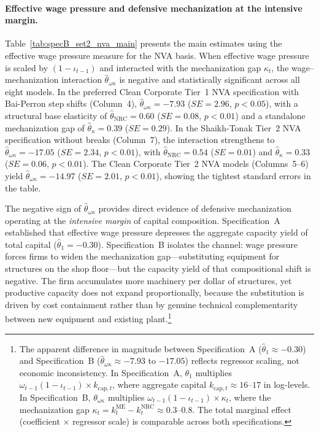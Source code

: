 \paragraph{Effective wage pressure and defensive mechanization at the intensive margin.}
Table~\ref{tab:specB_set2_nva_main} presents the main estimates using the effective wage pressure measure for the NVA basis. When effective wage pressure is scaled by $(1-\iota_{t-1})$ and interacted with the mechanization gap $\kappa_t$, the wage--mechanization interaction $\hat{\theta}_{\omega\kappa}$ is negative and statistically significant across all eight models. In the preferred Clean Corporate Tier~1 NVA specification with Bai-Perron step shifts (Column~4), $\hat{\theta}_{\omega\kappa} = -7.93$ ($SE = 2.96$, $p < 0.05$), with a structural base elasticity of $\hat{\theta}_{\text{NRC}} = 0.60$ ($SE = 0.08$, $p < 0.01$) and a standalone mechanization gap of $\hat{\theta}_\kappa = 0.39$ ($SE = 0.29$). In the Shaikh-Tonak Tier~2 NVA specification without breaks (Column~7), the interaction strengthens to $\hat{\theta}_{\omega\kappa} = -17.05$ ($SE = 2.34$, $p < 0.01$), with $\hat{\theta}_{\text{NRC}} = 0.54$ ($SE = 0.01$) and $\hat{\theta}_\kappa = 0.33$ ($SE = 0.06$, $p < 0.01$). The Clean Corporate Tier~2 NVA models (Columns~5--6) yield $\hat{\theta}_{\omega\kappa} = -14.97$ ($SE = 2.01$, $p < 0.01$), showing the tightest standard errors in the table.

The negative sign of $\hat{\theta}_{\omega\kappa}$ provides direct evidence of defensive mechanization operating at the \emph{intensive margin} of capital composition. Specification~A established that effective wage pressure depresses the aggregate capacity yield of total capital ($\hat{\theta}_1 = -0.30$). Specification~B isolates the channel: wage pressure forces firms to widen the mechanization gap---substituting equipment for structures on the shop floor---but the capacity yield of that compositional shift is negative. The firm accumulates more machinery per dollar of structures, yet productive capacity does not expand proportionally, because the substitution is driven by cost containment rather than by genuine technical complementarity between new equipment and existing plant.\footnote{The apparent difference in magnitude between Specification~A ($\hat{\theta}_1 \approx -0.30$) and Specification~B ($\hat{\theta}_{\omega\kappa} \approx -7.93$ to $-17.05$) reflects regressor scaling, not economic inconsistency. In Specification~A, $\theta_1$ multiplies $\omega_{t-1}(1-\iota_{t-1}) \times k_{\text{cap},t}$, where aggregate capital $k_{\text{cap},t} \approx 16$--$17$ in log-levels. In Specification~B, $\theta_{\omega\kappa}$ multiplies $\omega_{t-1}(1-\iota_{t-1}) \times \kappa_t$, where the mechanization gap $\kappa_t = k^{\text{ME}}_t - k^{\text{NRC}}_t \approx 0.3$--$0.8$. The total marginal effect (coefficient $\times$ regressor scale) is comparable across both specifications.}

